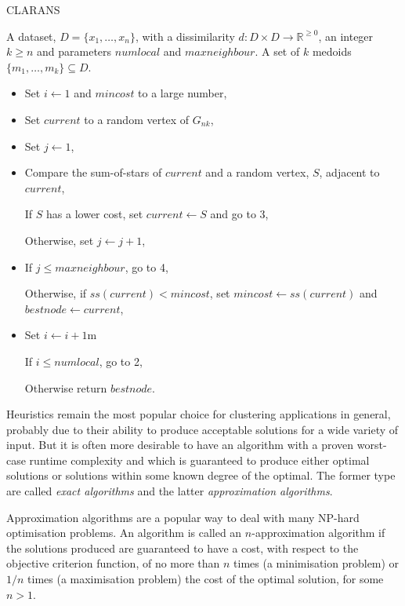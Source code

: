 \documentclass[a4paper]{report}
\newcommand{\dset}{D}
\begin{document}
\begin{algorithm}[h]
  \caption{CLARANS}
  \label{alg:clarans}
  \begin{algorithmic}
    \Require A dataset, $\dset = \{x_1,\dotsc,x_n\}$, with a dissimilarity $d
             \colon \dset \times \dset \to \mathbb{R}^{\geq 0}$, an integer
             $k \geq n$ and parameters $numlocal$ and $maxneighbour$.
    \Ensure  A set of $k$ medoids $\{m_1,\dotsc,m_k\}\subseteq \dset$.
    \begin{itemize}
    \item Set $i \gets 1$ and $mincost$ to a large number,
    \item Set $current$ to a random vertex of $G_{nk}$,
    \item Set $j \gets 1$,
    \item Compare the sum-of-stars of $current$ and a random vertex, $S$,
      adjacent to $current$,

      If $S$ has a lower cost, set $current \gets S$ and go to 3,

      Otherwise, set $j \gets j+1$,
    \item If $j \leq maxneighbour$, go to 4,

      Otherwise, if $ss(current)<mincost$, set $mincost \gets ss(current)$ and
      $bestnode \gets current$,
    \item Set $i \gets i+1$m

      If $i \leq numlocal$, go to 2,
  
      Otherwise return $bestnode$.
    \end{itemize}
  \end{algorithmic}

\end{algorithm}

\noindent Heuristics remain the most popular choice for clustering
applications in general, probably due to their ability to produce acceptable
solutions for a wide variety of input.  But it is often more desirable to have
an algorithm with a proven worst-case runtime complexity and which is
guaranteed to produce either optimal solutions or solutions within some known
degree of the optimal.  The former type are called \textit{exact algorithms}
and the latter \textit{approximation algorithms}.

Approximation algorithms are a popular way to deal with many NP-hard
optimisation problems.  An algorithm is called an $n$-approximation algorithm
if the solutions produced are guaranteed to have a cost, with respect to the
objective criterion function, of no more than $n$ times (a minimisation
problem) or $1/n$ times (a maximisation problem) the cost of the optimal
solution, for some $n > 1$.
\end{document}
